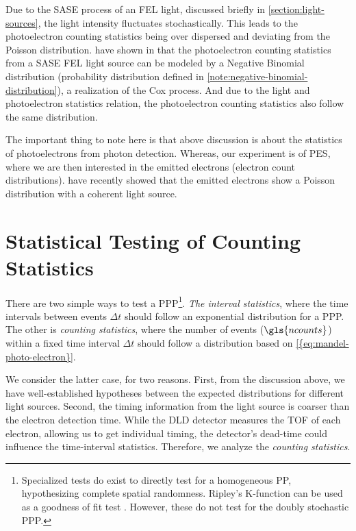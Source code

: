 Due to the \gls{SASE} process of an \gls{FEL} light, discussed briefly in \cref{section:light-sources}, the light intensity fluctuates stochastically. This leads to the photoelectron counting statistics being over dispersed and deviating from the Poisson distribution. \citeauthor{saldinStatisticalPropertiesRadiation1998} have shown in \cite{saldinStatisticalPropertiesRadiation1998} that the photoelectron counting statistics from a \gls{SASE} \gls{FEL} light source can be modeled by a Negative Binomial distribution (probability distribution defined in \cref{note:negative-binomial-distribution}), a realization of the Cox process. And due to the light and photoelectron statistics relation, the photoelectron counting statistics also follow the same distribution.

The important thing to note here is that above discussion is about the statistics of photoelectrons from photon detection. Whereas, our experiment is of \gls{PES}, where we are then interested in the emitted electrons (electron count distributions). \citeauthor{heimerlMultiphotonElectronEmission2024} \cite{heimerlMultiphotonElectronEmission2024} have recently showed that the emitted electrons show a Poisson distribution with a coherent light source. 

\section{Statistical Testing of Counting Statistics}
There are two simple ways to test a \gls{PPP}\footnote{Specialized tests do exist to directly test for a homogeneous \gls{PP}, hypothesizing complete spatial randomness. Ripley's K-function can be used as a goodness of fit test \cite[Section~2.6.4]{chiuStochasticGeometryIts2013}. However, these do not test for the doubly stochastic \gls{PPP}.}. \textit{The interval statistics}, where the time intervals between events $\Delta t$ should follow an exponential distribution for a \gls{PPP}. The other is \textit{counting statistics}, where the number of events ($\gls{ncounts}$) within a fixed time interval $\Delta t$ should follow a distribution based on \cref{{eq:mandel-photo-electron}}.

We consider the latter case, for two reasons. First, from the discussion above, we have well-established hypotheses between the expected distributions for different light sources. Second, the timing information from the light source is coarser than the electron detection time. While the \gls{DLD} detector measures the \gls{TOF} of each electron, allowing us to get individual timing, the detector's dead-time could influence the time-interval statistics. Therefore, we analyze the \textit{counting statistics}.

